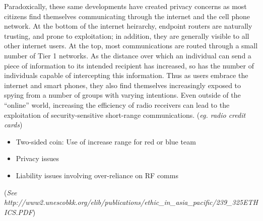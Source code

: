 Paradoxically, these same developments have created privacy concerns as
most citizens find themselves communicating through the internet and the
cell phone network. At the bottom of the internet heirarchy, endpoint
routers are naturally trusting, and prone to exploitation; in addition,
they are generally visible to all other internet users. At the top, most
communications are routed through a small number of Tier 1 networks. As
the distance over which an individual can send a piece of information to
its intended recipient has increased, so has the number of individuals
capable of intercepting this information. Thus as users embrace the
internet and smart phones, they also find themselves increasingly
exposed to spying from a number of groups with varying intentions. Even
outside of the ``online'' world, increasing the efficiency of radio
receivers can lead to the exploitation of security-sensitive short-range
communications. (\emph{eg. radio credit cards})

\begin{itemize}
\itemsep1pt\parskip0pt
\item
  Two-sided coin: Use of increase range for red or blue team
\item
  Privacy issues
\item
  Liability issues involving over-reliance on RF comms
\end{itemize}

(\emph{See
http://www2.unescobkk.org/elib/publications/ethic\_in\_asia\_pacific/239\_325ETHICS.PDF})
